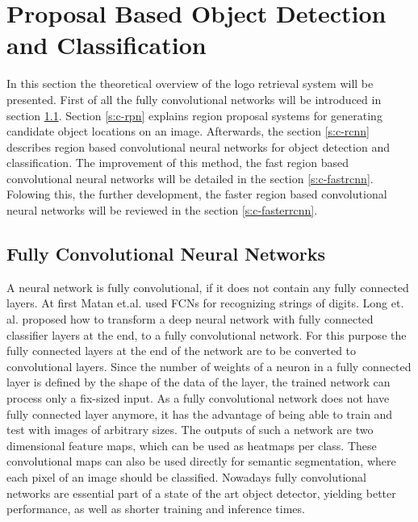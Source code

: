 \chapter{Proposal Based Object Detection and Classification}

In this section the theoretical overview of the logo retrieval system will be presented. First of all the fully convolutional networks will be introduced in section \ref{s:c-fullyconvnet}. Section \ref{s:c-rpn} explains region proposal systems for generating candidate object locations on an image. Afterwards, the section \ref{s:c-rcnn} describes region based convolutional neural networks for object detection and classification. The improvement of this method, the fast region based convolutional neural networks will be detailed in the section \ref{s:c-fastrcnn}. Folowing this, the further development, the faster region based convolutional neural networks will be reviewed in the section \ref{s:c-fasterrcnn}.

\section{Fully Convolutional Neural Networks}\label{s:c-fullyconvnet}
A neural network is fully convolutional, if it does not contain any fully connected layers. At first Matan et.al. used FCNs for recognizing strings of digits. Long et. al. proposed \cite{DBLP:journals/corr/LongSD14} how to transform a deep neural network with fully connected classifier layers at the end, to a fully convolutional network. For this purpose the fully connected layers at the end of the network are to be converted to convolutional layers.
\smallbreak
Since the number of weights of a neuron in a fully connected layer is defined by the shape of the data of the layer, the trained network can process only a fix-sized input. As a fully convolutional network does not have fully connected layer anymore, it has the advantage of being able to train and test with images of arbitrary sizes.
\smallbreak
The outputs of such a network are two dimensional feature maps, which can be used as heatmaps per class. These convolutional maps can also be used directly for semantic segmentation, where each pixel of an image should be classified.
Nowadays fully convolutional networks are essential part of a state of the art object detector, yielding better performance, as well as shorter training and inference times.

